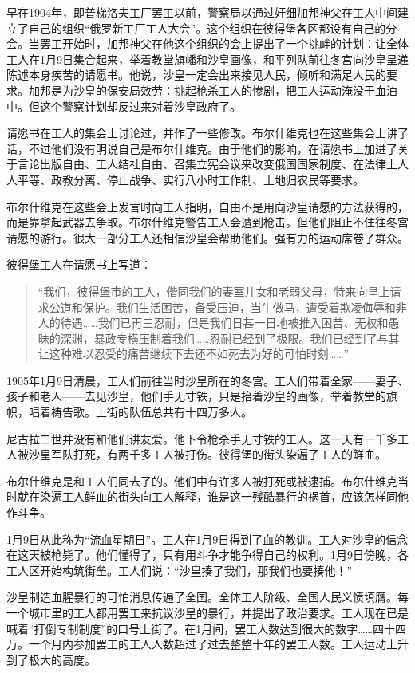 早在1904年，即普梯洛夫工厂罢工以前，警察局以通过奸细加邦神父在工人中间建立了自己的组织“俄罗新工厂工人大会”。这个组织在彼得堡各区都设有自己的分会。当罢工开始时，加邦神父在他这个组织的会上提出了一个挑衅的计划：让全体工人在1月9日集合起来，举着教堂旗幡和沙皇画像，和平列队前往冬宫向沙皇呈递陈述本身疾苦的请愿书。他说，沙皇一定会出来接见人民，倾听和满足人民的要求。加邦是为沙皇的保安局效劳：挑起枪杀工人的惨剧，把工人运动淹没于血泊中。但这个警察计划却反过来对着沙皇政府了。

请愿书在工人的集会上讨论过，并作了一些修改。布尔什维克也在这些集会上讲了话，不过他们没有明说自己是布尔什维克。由于他们的影响，在请愿书上加进了关于言论出版自由、工人结社自由、召集立宪会议来改变俄国国家制度、在法律上人人平等、政教分离、停止战争、实行八小时工作制、土地归农民等要求。

布尔什维克在这些会上发言时向工人指明，自由不是用向沙皇请愿的方法获得的，而是靠拿起武器去争取。布尔什维克警告工人会遭到枪击。但他们阻止不住往冬宫请愿的游行。很大一部分工人还相信沙皇会帮助他们。强有力的运动席卷了群众。

彼得堡工人在请愿书上写道：

\begin{quotation}
“我们，彼得堡市的工人，偕同我们的妻室儿女和老弱父母，特来向皇上请求公道和保护。我们生活困苦，备受压迫，当牛做马，遭受着欺凌侮辱和非人的待遇……我们已再三忍耐，但是我们日甚一日地被推入困苦、无权和愚昧的深渊，暴政专横压制着我们……忍耐已经到了极限。我们已经到了与其让这种难以忍受的痛苦继续下去还不如死去为好的可怕时刻……”
\end{quotation}

1905年1月9日清晨，工人们前往当时沙皇所在的冬宫。工人们带着全家——妻子、孩子和老人——去见沙皇，他们手无寸铁，只是抬着沙皇的画像，举着教堂的旗帜，唱着祷告歌。上街的队伍总共有十四万多人。

尼古拉二世并没有和他们讲友爱。他下令枪杀手无寸铁的工人。这一天有一千多工人被沙皇军队打死，有两千多工人被打伤。彼得堡的街头染遍了工人的鲜血。

布尔什维克是和工人们同去了的。他们中有许多人被打死或被逮捕。布尔什维克当时就在染遍工人鲜血的街头向工人解释，谁是这一残酷暴行的祸首，应该怎样同他作斗争。

1月9日从此称为“流血星期日”。工人在1月9日得到了血的教训。工人对沙皇的信念在这天被枪毙了。他们懂得了，只有用斗争才能争得自己的权利。1月9日傍晚，各工人区开始构筑街垒。工人们说：“沙皇揍了我们，那我们也要揍他！”

沙皇制造血腥暴行的可怕消息传遍了全国。全体工人阶级、全国人民义愤填膺。每一个城市里的工人都用罢工来抗议沙皇的暴行，并提出了政治要求。工人现在已是喊着“打倒专制制度”的口号上街了。在1月间，罢工人数达到很大的数字……四十四万。一个月内参加罢工的工人人数超过了过去整整十年的罢工人数。工人运动上升到了极大的高度。

